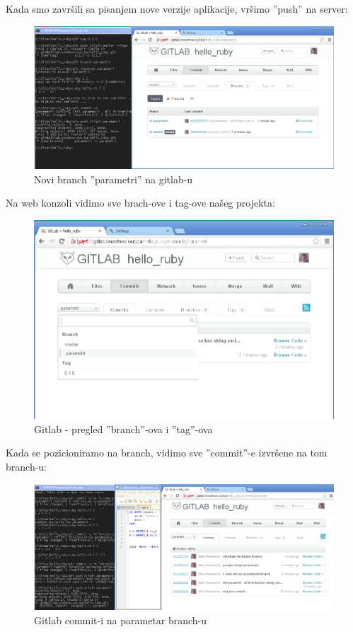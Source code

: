 \documentclass[times, utf8, seminar]{fit}
\begin{document}
Kada smo završili sa pisanjem nove verzije aplikacije, vršimo ''push'' na server:

\begin{figure}[H]
\centering
\includegraphics[width=15cm]{img/gitlab_new_branch.png}
\caption{Novi branch ''parametri'' na gitlab-u}
\end{figure}

Na web konzoli vidimo sve brach-ove i tag-ove našeg projekta:

\begin{figure}[H]
\centering
\includegraphics[width=15cm]{img/gitlab_new_branch_2.png}
\caption{Gitlab - pregled ''branch''-ova i ''tag''-ova}
\end{figure}

Kada se pozicioniramo na branch, vidimo sve ''commit''-e izvršene na tom branch-u:

\begin{figure}[H]
\centering
\includegraphics[width=15cm]{img/gitlab_new_branch_4_commits.png}
\caption{Gitlab commit-i na parametar branch-u}
\end{figure}
\end{document}
